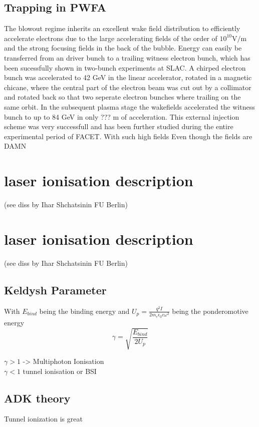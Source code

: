 \subsection{Trapping in PWFA}
The blowout regime inherits an excellent wake field distribution to efficiently accelerate electrons due to the large accelerating fields of the order of $10^{10} \mathrm{V/m}$ and the strong focusing fields in the back of the bubble. Energy can easily be transferred from an driver bunch to a trailing witness electron bunch, which has been sucessfully shown in two-bunch experiments at SLAC. A chirped electron bunch was accelerated to 42 GeV in the linear accelerator, rotated in a magnetic chicane, where the central part of the electron beam was cut out by a collimator and rotated back so that two seperate electron bunches where trailing on the same orbit. In the subsequent plasma stage the wakefields accelerated the witness bunch to up to 84 GeV in only ??? m of acceleration. This external injection scheme was very successfull and has been further studied during the entire experimental period of FACET. With such high fields 
Even though the fields are DAMN
\section{laser ionisation description}
(see diss by Ihar Shchatsinin FU Berlin)
\section{laser ionisation description}
(see diss by Ihar Shchatsinin FU Berlin)
\subsection{Keldysh Parameter}

With $E_{bind}$ being the binding energy and $U_p=\frac{q^2 I}{2 m_e \epsilon_0 c \omega^2}$ being the ponderomotive energy 
\begin{equation}
\gamma=\sqrt{\frac{E_{bind}}{2U_p}}
\end{equation}

$\gamma >1 $ -> Multiphoton Ionisation\\
$\gamma < 1$ tunnel ionisation or BSI

\subsection{ADK theory}
Tunnel ionization is great
